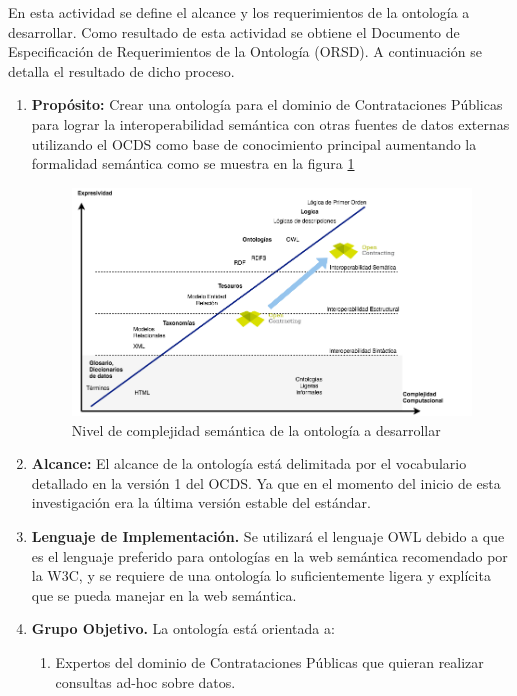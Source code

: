 En esta actividad se define el alcance y los requerimientos de la ontología a desarrollar. Como resultado de esta actividad se obtiene el Documento de Especificación de Requerimientos de la Ontología (ORSD). A continuación se detalla el resultado de dicho proceso.
\begin{enumerate}
\item \textbf{Propósito:} Crear una ontología para el dominio de Contrataciones Públicas para lograr la interoperabilidad semántica con otras fuentes de datos externas utilizando el OCDS como base de conocimiento principal aumentando la formalidad semántica como se muestra en la figura \ref{img:ocds-ocntology-complejidad}

\begin{figure}[h!]
\centering
\includegraphics[width=150mm]{figuras/Diagramas-OenContracting.png}
\caption{Nivel de complejidad semántica de la ontología a desarrollar}
\label{img:ocds-ocntology-complejidad}
\end{figure}
\item \textbf{Alcance:} El alcance de la ontología está delimitada por el vocabulario detallado en la versión 1 del OCDS. Ya que en el momento del inicio de esta investigación era la última versión estable del estándar.
\item \textbf{Lenguaje de Implementación.} Se utilizará el lenguaje OWL debido a que es el lenguaje preferido para ontologías en la web semántica recomendado por la W3C, y se requiere de una ontología lo suficientemente ligera y explícita que se pueda manejar en la web semántica.
\item \textbf{Grupo Objetivo. }La ontología está orientada a:
\begin{enumerate}
    \item Expertos del dominio de Contrataciones Públicas que quieran realizar consultas ad-hoc sobre datos.

\end{enumerate}
\end{enumerate}
